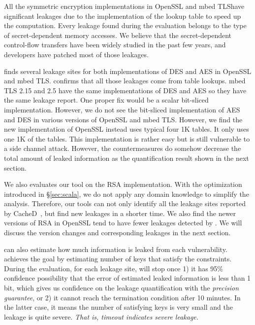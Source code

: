 All the symmetric encryption implementations in OpenSSL and mbed TLS\@ have significant
leakages due to the implementation of the lookup table to speed up the
computation. Every leakage found during the evaluation belongs to the type of
secret-dependent memory accesses. We believe that the secret-dependent
control-flow transfers have been widely studied in the past few years, and
developers have patched most of those leakages. 

\tool{} finds several leakage sites for both implementations of DES and AES in
OpenSSL and mbed TLS\@. \tool{} confirms that all those leakages come from table
lookups. mbed TLS 2.15 and 2.5 have the same implementations of DES and AES so
they have the same leakage report. One proper fix would be a scalar bit-sliced
implementation. However, we do not see the bit-sliced implementation of AES and
DES in various versions of OpenSSL and mbed TLS\@. However, we find the new
implementation of OpenSSL instead uses typical four 1K tables. It only uses one 1K
of the tables. This implementation is rather easy but is still vulnerable to a
side channel attack. However, the countermeasures do somehow decrease the total
amount of leaked information as the quantification result shown in the next
section.

We also evaluates our tool on the RSA implementation. With the optimization
introduced in \S\ref{sec:scala}, we do not apply any domain knowledge to
simplify the analysis. Therefore, our tools can not only identify all the leakage sites
reported by CacheD~\cite{203878}, but find new leakages in a shorter time. 
We also find the newer
versions of RSA in OpenSSL tend to have fewer leakages detected by \tool{}. We
will discuss the version changes and corresponding leakages in the next section.

\tool{} can also estimate how
much information is leaked from each vulnerability. \tool{} achieves the goal by
estimating number of keys that satisfy the constraints. During the evaluation,
for each leakage site, \tool{} will stop once 1) it has 95\% confidence
possibility that the error of estimated leaked information is less than 1 bit,
which gives us confidence on the leakage quantification with the \emph{precision guarantee}, 
or 2) it cannot reach the termination condition after 10 minutes. In
the latter case, it means the number of satisfying keys is very small and the
leakage is quite severe. \emph{That is, timeout indicates severe leakage.}
\label{loc:timeout}


